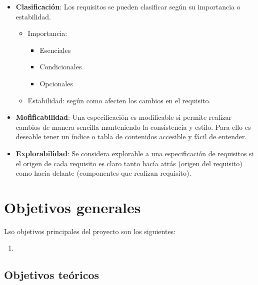 \begin{itemize}
  \item \textbf{Clasificación}: Los requisitos se pueden clasificar según su importancia o estabilidad.
        \begin{itemize}
          \item Importancia:
                \begin{itemize}
                  \item Esenciales
                  \item Condicionales
                  \item Opcionales
                \end{itemize}
          \item Estabilidad: según como afecten los cambios en el requisito.
        \end{itemize}

  \item \textbf{Mofificabilidad}: Una especificación es modificable si permite realizar cambios de manera sencilla manteniendo la consistencia y estilo. Para ello es deseable tener un índice o tabla de contenidos accesible y fácil de entender.

  \item \textbf{Explorabilidad}: Se considera explorable a una especificación de requisitos si el origen de cada requisito es claro tanto hacía atrás (origen del requisito) como hacia delante (componentes que realizan requisito).
\end{itemize}

\section{Objetivos generales}

Lso objetivos principales del proyecto son los siguientes:

\begin{enumerate}
  \item
\end{enumerate}

\subsection{Objetivos teóricos}

